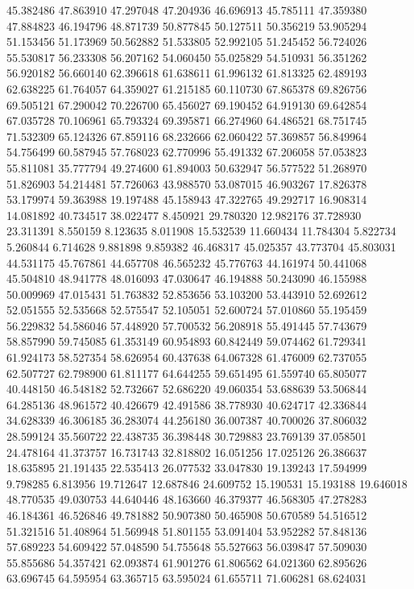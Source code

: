 45.382486
47.863910
47.297048
47.204936
46.696913
45.785111
47.359380
47.884823
46.194796
48.871739
50.877845
50.127511
50.356219
53.905294
51.153456
51.173969
50.562882
51.533805
52.992105
51.245452
56.724026
55.530817
56.233308
56.207162
54.060450
55.025829
54.510931
56.351262
56.920182
56.660140
62.396618
61.638611
61.996132
61.813325
62.489193
62.638225
61.764057
64.359027
61.215185
60.110730
67.865378
69.826756
69.505121
67.290042
70.226700
65.456027
69.190452
64.919130
69.642854
67.035728
70.106961
65.793324
69.395871
66.274960
64.486521
68.751745
71.532309
65.124326
67.859116
68.232666
62.060422
57.369857
56.849964
54.756499
60.587945
57.768023
62.770996
55.491332
67.206058
57.053823
55.811081
35.777794
49.274600
61.894003
50.632947
56.577522
51.268970
51.826903
54.214481
57.726063
43.988570
53.087015
46.903267
17.826378
53.179974
59.363988
19.197488
45.158943
47.322765
49.292717
16.908314
14.081892
40.734517
38.022477
8.450921
29.780320
12.982176
37.728930
23.311391
8.550159
8.123635
8.011908
15.532539
11.660434
11.784304
5.822734
5.260844
6.714628
9.881898
9.859382
46.468317
45.025357
43.773704
45.803031
44.531175
45.767861
44.657708
46.565232
45.776763
44.161974
50.441068
45.504810
48.941778
48.016093
47.030647
46.194888
50.243090
46.155988
50.009969
47.015431
51.763832
52.853656
53.103200
53.443910
52.692612
52.051555
52.535668
52.575547
52.105051
52.600724
57.010860
55.195459
56.229832
54.586046
57.448920
57.700532
56.208918
55.491445
57.743679
58.857990
59.745085
61.353149
60.954893
60.842449
59.074462
61.729341
61.924173
58.527354
58.626954
60.437638
64.067328
61.476009
62.737055
62.507727
62.798900
61.811177
64.644255
59.651495
61.559740
65.805077
40.448150
46.548182
52.732667
52.686220
49.060354
53.688639
53.506844
64.285136
48.961572
40.426679
42.491586
38.778930
40.624717
42.336844
34.628339
46.306185
36.283074
44.256180
36.007387
40.700026
37.806032
28.599124
35.560722
22.438735
36.398448
30.729883
23.769139
37.058501
24.478164
41.373757
16.731743
32.818802
16.051256
17.025126
26.386637
18.635895
21.191435
22.535413
26.077532
33.047830
19.139243
17.594999
9.798285
6.813956
19.712647
12.687846
24.609752
15.190531
15.193188
19.646018
48.770535
49.030753
44.640446
48.163660
46.379377
46.568305
47.278283
46.184361
46.526846
49.781882
50.907380
50.465908
50.670589
54.516512
51.321516
51.408964
51.569948
51.801155
53.091404
53.952282
57.848136
57.689223
54.609422
57.048590
54.755648
55.527663
56.039847
57.509030
55.855686
54.357421
62.093874
61.901276
61.806562
64.021360
62.895626
63.696745
64.595954
63.365715
63.595024
61.655711
71.606281
68.624031
